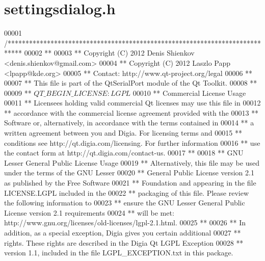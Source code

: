 \hypertarget{a00045_source}{\section{settingsdialog.\+h}
\label{a00045_source}
}

\begin{DoxyCode}
00001 \textcolor{comment}{/****************************************************************************}
00002 \textcolor{comment}{**}
00003 \textcolor{comment}{** Copyright (C) 2012 Denis Shienkov <denis.shienkov@gmail.com>}
00004 \textcolor{comment}{** Copyright (C) 2012 Laszlo Papp <lpapp@kde.org>}
00005 \textcolor{comment}{** Contact: http://www.qt-project.org/legal}
00006 \textcolor{comment}{**}
00007 \textcolor{comment}{** This file is part of the QtSerialPort module of the Qt Toolkit.}
00008 \textcolor{comment}{**}
00009 \textcolor{comment}{** $QT\_BEGIN\_LICENSE:LGPL$}
00010 \textcolor{comment}{** Commercial License Usage}
00011 \textcolor{comment}{** Licensees holding valid commercial Qt licenses may use this file in}
00012 \textcolor{comment}{** accordance with the commercial license agreement provided with the}
00013 \textcolor{comment}{** Software or, alternatively, in accordance with the terms contained in}
00014 \textcolor{comment}{** a written agreement between you and Digia.  For licensing terms and}
00015 \textcolor{comment}{** conditions see http://qt.digia.com/licensing.  For further information}
00016 \textcolor{comment}{** use the contact form at http://qt.digia.com/contact-us.}
00017 \textcolor{comment}{**}
00018 \textcolor{comment}{** GNU Lesser General Public License Usage}
00019 \textcolor{comment}{** Alternatively, this file may be used under the terms of the GNU Lesser}
00020 \textcolor{comment}{** General Public License version 2.1 as published by the Free Software}
00021 \textcolor{comment}{** Foundation and appearing in the file LICENSE.LGPL included in the}
00022 \textcolor{comment}{** packaging of this file.  Please review the following information to}
00023 \textcolor{comment}{** ensure the GNU Lesser General Public License version 2.1 requirements}
00024 \textcolor{comment}{** will be met: http://www.gnu.org/licenses/old-licenses/lgpl-2.1.html.}
00025 \textcolor{comment}{**}
00026 \textcolor{comment}{** In addition, as a special exception, Digia gives you certain additional}
00027 \textcolor{comment}{** rights.  These rights are described in the Digia Qt LGPL Exception}
00028 \textcolor{comment}{** version 1.1, included in the file LGPL\_EXCEPTION.txt in this package.}

\end{DoxyCode}
